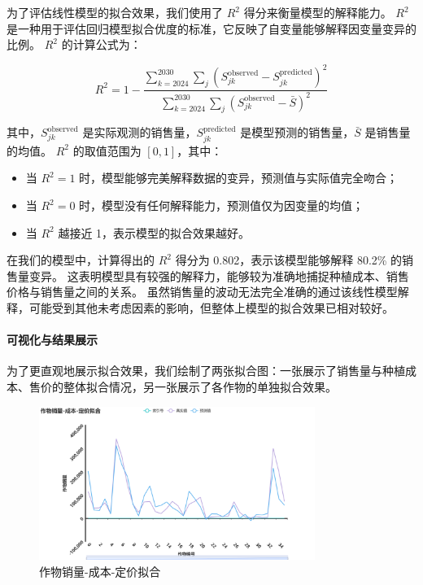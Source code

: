 \documentclass[12pt,a4paper]{nmmcm}
\begin{document}
为了评估线性模型的拟合效果，我们使用了 $R^2$ 得分来衡量模型的解释能力。
$R^2$ 是一种用于评估回归模型拟合优度的标准，它反映了自变量能够解释因变量变异的比例。
$R^2$ 的计算公式为：

\[
  R^2 = 1 - \frac{\sum_{k=2024}^{2030} \sum_{j} \left( S_{jk}^{\text{observed}} - S_{jk}^{\text{predicted}} \right)^2}{\sum_{k=2024}^{2030} \sum_{j} \left( S_{jk}^{\text{observed}} - \bar{S} \right)^2}
\]

其中，$S_{jk}^{\text{observed}}$ 是实际观测的销售量，$S_{jk}^{\text{predicted}}$ 是模型预测的销售量，$\bar{S}$ 是销售量的均值。
$R^2$ 的取值范围为 $[0,1]$，其中：
\begin{itemize}
  \item 当 $R^2 = 1$ 时，模型能够完美解释数据的变异，预测值与实际值完全吻合；
  \item 当 $R^2 = 0$ 时，模型没有任何解释能力，预测值仅为因变量的均值；
  \item 当 $R^2$ 越接近 1，表示模型的拟合效果越好。

\end{itemize}

在我们的模型中，计算得出的 $R^2$ 得分为 0.802，表示该模型能够解释 80.2\% 的销售量变异。
这表明模型具有较强的解释力，能够较为准确地捕捉种植成本、销售价格与销售量之间的关系。
虽然销售量的波动无法完全准确的通过该线性模型解释，可能受到其他未考虑因素的影响，但整体上模型的拟合效果已相对较好。


\paragraph{可视化与结果展示}

为了更直观地展示拟合效果，我们绘制了两张拟合图：一张展示了销售量与种植成本、售价的整体拟合情况，另一张展示了各作物的单独拟合效果。


\begin{figure}[H]
  \centering
  \includegraphics[width=0.8\textwidth]{figures/prob3/correlation/作物销量-成本-定价拟合.png}
  \caption{作物销量-成本-定价拟合}
  \label{fig:fitting1}
\end{figure}
\end{document}
